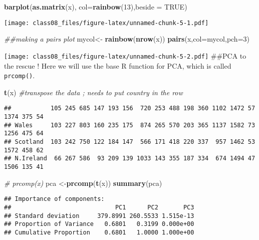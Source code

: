 \documentclass[
]{article}
\newenvironment{Shaded}{\begin{snugshade}}{\end{snugshade}}
\newcommand{\CommentTok}[1]{\textcolor[rgb]{0.56,0.35,0.01}{\textit{#1}}}
\newcommand{\DataTypeTok}[1]{\textcolor[rgb]{0.13,0.29,0.53}{#1}}
\newcommand{\DecValTok}[1]{\textcolor[rgb]{0.00,0.00,0.81}{#1}}
\newcommand{\KeywordTok}[1]{\textcolor[rgb]{0.13,0.29,0.53}{\textbf{#1}}}
\newcommand{\NormalTok}[1]{#1}
\newcommand{\OtherTok}[1]{\textcolor[rgb]{0.56,0.35,0.01}{#1}}
\newcommand{\StringTok}[1]{\textcolor[rgb]{0.31,0.60,0.02}{#1}}
\begin{document}
\begin{Shaded}
\begin{Highlighting}[]
\KeywordTok{barplot}\NormalTok{(}\KeywordTok{as.matrix}\NormalTok{(x), }\DataTypeTok{col=}\KeywordTok{rainbow}\NormalTok{(}\DecValTok{13}\NormalTok{),}\DataTypeTok{beside =} \OtherTok{TRUE}\NormalTok{)}
\end{Highlighting}
\end{Shaded}

\texttt{[image: class08\_files/figure-latex/unnamed-chunk-5-1.pdf]}

\begin{Shaded}
\begin{Highlighting}[]
\CommentTok{##making a pairs plot}
\NormalTok{mycol<-}\StringTok{ }\KeywordTok{rainbow}\NormalTok{(}\KeywordTok{nrow}\NormalTok{(x))}
\KeywordTok{pairs}\NormalTok{(x,}\DataTypeTok{col=}\NormalTok{mycol,}\DataTypeTok{pch=}\DecValTok{3}\NormalTok{)  }
\end{Highlighting}
\end{Shaded}

\texttt{[image: class08\_files/figure-latex/unnamed-chunk-5-2.pdf]}
\#\#PCA to the rescue ! Here we will use the base R function for PCA,
which is called \texttt{prcomp()}.

\begin{Shaded}
\begin{Highlighting}[]
\KeywordTok{t}\NormalTok{(x) }\CommentTok{#transpose the data ; needs to put country in the row }
\end{Highlighting}
\end{Shaded}

\begin{verbatim}
##           105 245 685 147 193 156  720 253 488 198 360 1102 1472 57 1374 375 54
## Wales     103 227 803 160 235 175  874 265 570 203 365 1137 1582 73 1256 475 64
## Scotland  103 242 750 122 184 147  566 171 418 220 337  957 1462 53 1572 458 62
## N.Ireland  66 267 586  93 209 139 1033 143 355 187 334  674 1494 47 1506 135 41
\end{verbatim}

\begin{Shaded}
\begin{Highlighting}[]
\CommentTok{# prcomp(x)}
\NormalTok{pca <-}\KeywordTok{prcomp}\NormalTok{(}\KeywordTok{t}\NormalTok{(x))}
\KeywordTok{summary}\NormalTok{(pca)}
\end{Highlighting}
\end{Shaded}

\begin{verbatim}
## Importance of components:
##                             PC1      PC2       PC3
## Standard deviation     379.8991 260.5533 1.515e-13
## Proportion of Variance   0.6801   0.3199 0.000e+00
## Cumulative Proportion    0.6801   1.0000 1.000e+00
\end{verbatim}
\end{document}
